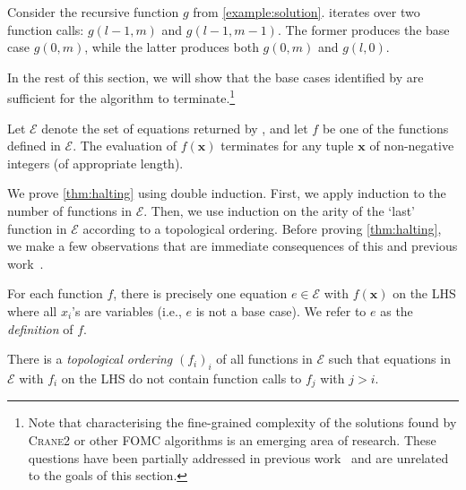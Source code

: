 \documentclass[a4paper,UKenglish,cleveref,autoref]{lipics-v2021}
\newcommand{\Cranetwo}{\textsc{Crane2}}
\begin{document}
\begin{example}
  Consider the recursive function $g$ from \cref{example:solution}.
  \FindBaseCases iterates over two function calls: $g(l-1, m)$ and
  $g(l-1, m-1)$. The former produces the base case $g(0, m)$, while the latter
  produces both $g(0, m)$ and $g(l, 0)$.
\end{example}

In the rest of this section, we will show that the base cases identified by
\FindBaseCases are sufficient for the algorithm to terminate.\footnote{Note that
  characterising the fine-grained complexity of the solutions found by
  \Cranetwo{} or other FOMC algorithms is an emerging area of research. These
  questions have been partially addressed in previous
  work~\cite{DBLP:conf/kr/DilkasB23,DBLP:conf/kr/TothK24} and are unrelated to
  the goals of this section.}

\begin{theorem}\label{thm:halting}
  Let $\mathcal{E}$ denote the set of equations returned by
  \CompileWithBaseCases, and let $f$ be one of the functions defined in
  $\mathcal{E}$. The evaluation of $f(\mathbf{x})$ terminates for any tuple
  $\mathbf{x}$ of non-negative integers (of appropriate length).
\end{theorem}

We prove \cref{thm:halting} using double induction. First, we apply induction to
the number of functions in $\mathcal{E}$. Then, we use induction on the arity of
the `last' function in $\mathcal{E}$ according to a topological ordering. Before
proving \cref{thm:halting}, we make a few observations that are immediate
consequences of this and previous
work~\cite{DBLP:conf/kr/DilkasB23,DBLP:conf/ijcai/BroeckTMDR11}.

\begin{observation}\label{assumption1}
  For each function $f$, there is precisely one equation $e \in \mathcal{E}$
  with $f(\mathbf{x})$ on the LHS where all $x_{i}$'s are variables (i.e., $e$
  is not a base case). We refer to $e$ as the \emph{definition} of $f$.
\end{observation}

\begin{observation}\label{assumption2}
  There is a \emph{topological ordering} ${(f_{i})}_{i}$ of all functions in
  $\mathcal{E}$ such that equations in $\mathcal{E}$ with $f_{i}$ on the LHS do
  not contain function calls to $f_{j}$ with $j > i$.
\end{observation}
\end{document}

